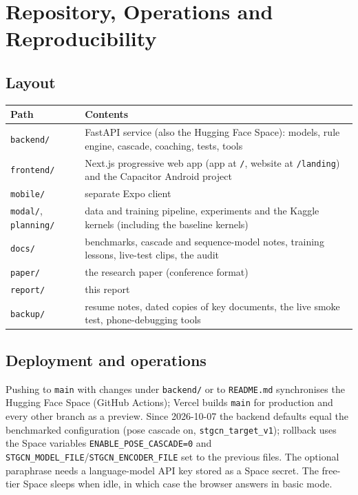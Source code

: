 \section{Repository, Operations and Reproducibility}\label{sec:repo}
\subsection{Layout}
\begin{tabularx}{\textwidth}{@{}lX@{}}
\toprule
Path & Contents \\ \midrule
\texttt{backend/} & FastAPI service (also the Hugging Face Space): models, rule engine, cascade, coaching, tests, tools \\
\texttt{frontend/} & Next.js progressive web app (app at \texttt{/}, website at \texttt{/landing}) and the Capacitor Android project \\
\texttt{mobile/} & separate Expo client \\
\texttt{modal/}, \texttt{planning/} & data and training pipeline, experiments and the Kaggle kernels (including the baseline kernels) \\
\texttt{docs/} & benchmarks, cascade and sequence-model notes, training lessons, live-test clips, the audit \\
\texttt{paper/} & the research paper (conference format) \\
\texttt{report/} & this report \\
\texttt{backup/} & resume notes, dated copies of key documents, the live smoke test, phone-debugging tools \\ \bottomrule
\end{tabularx}

\subsection{Deployment and operations}
Pushing to \texttt{main} with changes under \texttt{backend/} or to \texttt{README.md} synchronises the Hugging Face Space (GitHub Actions); Vercel builds \texttt{main} for production and every other branch as a preview. Since 2026-10-07 the backend defaults equal the benchmarked configuration (pose cascade on, \texttt{stgcn\_target\_v1}); rollback uses the Space variables \texttt{ENABLE\_POSE\_CASCADE=0} and \texttt{STGCN\_MODEL\_FILE}/\texttt{STGCN\_ENCODER\_FILE} set to the previous files. The optional paraphrase needs a language-model API key stored as a Space secret. The free-tier Space sleeps when idle, in which case the browser answers in basic mode.

